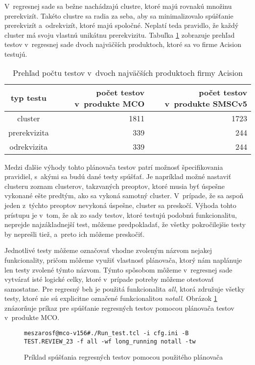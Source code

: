 V~regresnej sade sa bežne nachádzajú clustre, ktoré majú rovnakú množinu prerekvizít. Takéto clustre sa radia za seba, aby sa minimalizovalo
spúšťanie prerekvizít a~odrekvizít, ktoré majú spoločné. Neplatí teda pravidlo, že každý cluster má svoju vlastnú unikátnu prerekvizitu.
Tabuľka \ref{table:pocet_testov} zobrazuje prehľad testov v~regresnej sade dvoch najväčších produktoch,
ktoré sa vo firme Acision testujú.

\begin{table}
  \begin{center}
    \begin{tabular}{| c | r | r |}
    \hline
    typ testu & počet testov v~produkte MCO & počet testov v~produkte SMSCv5 \\ \hline
    cluster & 1811 & 1723 \\ \hline
    prerekvizita & 339 & 244 \\ \hline
    odrekvizita & 339 & 244 \\
    \hline
    \end{tabular}
    \label{table:pocet_testov}
    \caption{Prehľad počtu testov v~dvoch najväčších produktoch firmy Acision}
  \end{center}
\end{table}


Medzi ďalšie výhody tohto plánovača testov patrí možnosť špecifikovania pravidiel, s~akými sa budú dané testy spúšťať.
Je napríklad možné nastaviť clusteru zoznam clusterov, takzvaných preoptov, ktoré musia byť úspešne vykonané ešte predtým, ako sa vykoná samotný
cluster. V~prípade, že sa aspoň jeden z~týchto preoptov nevykoná úspešne, cluster sa preskočí.
Výhoda tohto prístupu je v~tom, že ak zo sady testov, ktoré testujú podobnú funkcionalitu, neprejde najzákladnejší test,
môžeme predpokladať, že všetky pokročilejšie testy by neprešli tiež, a~preto ich môžeme preskočiť.

Jednotlivé testy môžeme označovať vhodne zvoleným názvom nejakej funkcionality, pričom môžeme využiť vlastnosť 
plánovača, ktorý nám naplánuje len testy zvolené týmto názvom. Týmto spôsobom môžeme v~regresnej sade vytvárať isté logické celky,
ktoré v~prípade potreby môžeme otestovať samostatne. Pre regresný beh je použitá funkcionalita {\it all}, ktorá združuje 
všetky testy, ktoré nie sú explicitne označené funkcionalitou {\it notall}. Obrázok \ref{fig:spustanie_testov} znázorňuje príkaz pre spúšťanie
regresných testov pomocou plánovača testov v~produkte MCO.

\begin{figure}[h]
\begin{lstlisting}
meszarosf@mco-v156#./Run_test.tcl -i cfg.ini -B TEST.REVIEW_23 -f all -wf long_running notall -tw
\end{lstlisting}
\caption{Príklad spúšťania regresných testov pomocou použitého plánovača}
\label{fig:spustanie_testov}
\end{figure}

